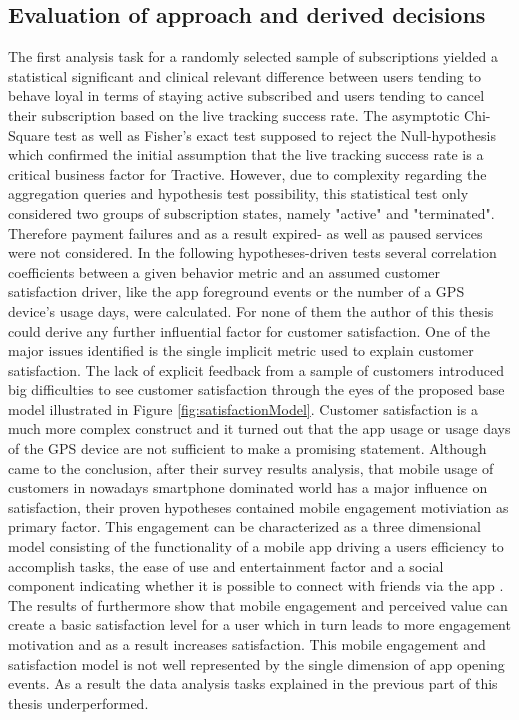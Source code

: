 \subsection{Evaluation of approach and derived decisions}
The first analysis task for a randomly selected sample of subscriptions yielded a statistical significant and clinical relevant difference between users tending to behave loyal in terms of staying active subscribed and users tending to cancel their subscription based on the live tracking success rate. The asymptotic Chi-Square test as well as Fisher's exact test supposed to reject the Null-hypothesis which confirmed the initial assumption that the live tracking success rate is a critical business factor for Tractive. However, due to complexity regarding the aggregation queries and hypothesis test possibility, this statistical test only considered two groups of subscription states, namely "active" and "terminated". Therefore payment failures and as a result expired- as well as paused services were not considered. In the following hypotheses-driven tests several correlation coefficients between a given behavior metric and an assumed customer satisfaction driver, like the app foreground events or the number of a GPS device's usage days, were calculated. For none of them the author of this thesis could derive any further influential factor for customer satisfaction. One of the major issues identified is the single implicit metric used to explain customer satisfaction. The lack of explicit feedback from a sample of customers introduced big difficulties to see customer satisfaction through the eyes of the proposed base model illustrated in Figure \ref{fig:satisfactionModel}. Customer satisfaction is a much more complex construct and it turned out that the app usage or usage days of the GPS device are not sufficient to make a promising statement. Although \cite{kim2013study} came to the conclusion, after their survey results analysis, that mobile usage of customers in nowadays smartphone dominated world has a major influence on satisfaction, their proven hypotheses contained mobile engagement motiviation as primary factor. This engagement can be characterized as a three dimensional model consisting of the functionality of a mobile app driving a users efficiency to accomplish tasks, the ease of use and entertainment factor and a social component indicating whether it is possible to connect with friends via the app \cite{VARNALI2010144}. The results of \cite{kim2013study} furthermore show that mobile engagement and perceived value can create a basic satisfaction level for a user which in turn leads to more engagement motivation and as a result increases satisfaction. This mobile engagement and satisfaction model is not well represented by the single dimension of app opening events. As a result the data analysis tasks explained in the previous part of this thesis underperformed.

